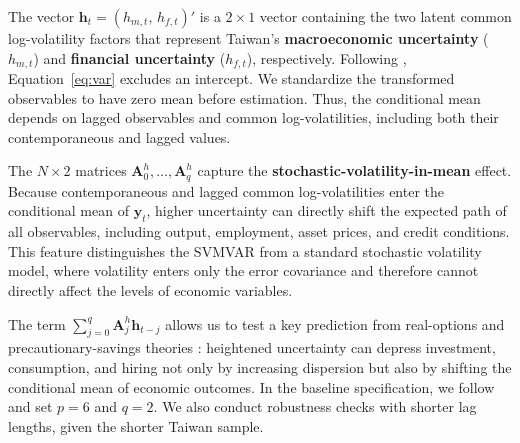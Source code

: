 The vector $\mathbf{h}_t = (h_{m,t},\, h_{f,t})'$ is a $2 \times 1$ vector containing the two latent common log-volatility factors that represent Taiwan's \textbf{macroeconomic uncertainty} ($h_{m,t}$) and \textbf{financial uncertainty} ($h_{f,t}$), respectively. Following \citet{davidson2025investigating}, Equation~\eqref{eq:var} excludes an intercept. We standardize the transformed observables to have zero mean before estimation. Thus, the conditional mean depends on lagged observables and common log-volatilities, including both their contemporaneous and lagged values.

The $N \times 2$ matrices $\mathbf{A}_0^{h}, \ldots, \mathbf{A}_q^{h}$ capture the \textbf{stochastic-volatility-in-mean} effect. Because contemporaneous and lagged common log-volatilities enter the conditional mean of $\mathbf{y}_t$, higher uncertainty can directly shift the expected path of all observables, including output, employment, asset prices, and credit conditions. This feature distinguishes the SVMVAR from a standard stochastic volatility model, where volatility enters only the error covariance and therefore cannot directly affect the levels of economic variables.

The term $\sum_{j=0}^{q} \mathbf{A}_j^{h}\mathbf{h}_{t-j}$ allows us to test a key prediction from real-options and precautionary-savings theories \citep{bloom2009impact,bloom2014fluctuations}: heightened uncertainty can depress investment, consumption, and hiring not only by increasing dispersion but also by shifting the conditional mean of economic outcomes. In the baseline specification, we follow \citet{davidson2025investigating} and set $p=6$ and $q=2$. We also conduct robustness checks with shorter lag lengths, given the shorter Taiwan sample.

